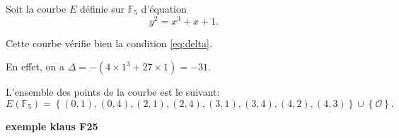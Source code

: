 \begin{exemple}
    Soit la courbe $E$ définie sur $\mathbb{F}_{5}$ d'équation
    \[
    y^2 =x^3+x+1
    .\] 

    Cette courbe vérifie bien la condition \eqref{eq:delta}.
    
    En effet, on a $\Delta = -(4 \times 1^3 + 27 \times 1) = -31$.

    L'ensemble des points de la courbe est le suivant:
    \[
    E(\mathbb{F}_{5})= \left\{ (0,1),(0,4),(2,1),(2,4),(3,1),(3,4),(4,2),(4,3) \right\} \cup
    \left\{ \mathcal{O} \right\} 
    .\] 

    \textbf{exemple klaus F25}



\end{exemple}
